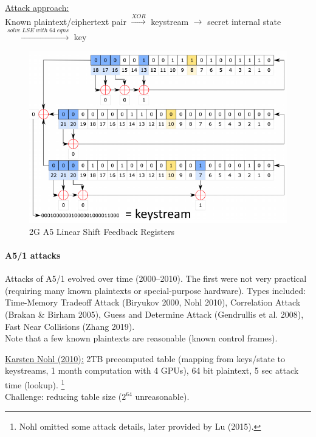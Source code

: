 \underline{Attack approach:} \\
Known plaintext/ciphertext pair
$\overset{XOR}{\longrightarrow}$ keystream
$\longrightarrow$ secret internal state
$\overset{solve\; LSE\; with\; 64\; eqns}{\longrightarrow}$ key

\begin{figure}[h]
	\centering
	\includegraphics[scale=0.5]{images/10-2g-a5.png}
	\caption{2G A5 Linear Shift Feedback Registers}
	\label{fig:2g-a5}
\end{figure}

\paragraph{A5/1 attacks}
Attacks of A5/1 evolved over time (2000--2010). The first were not very
practical (requiring many known plaintexts or special-purpose hardware). Types
included: Time-Memory Tradeoff Attack (Biryukov 2000, Nohl 2010), Correlation
Attack (Brakan \& Birham 2005), Guess and Determine Attack (Gendrullis et al.
2008), Fast Near Collisions (Zhang 2019). \\ Note that a few known plaintexts
are reasonable (known control frames).

\href{https://media.blackhat.com/bh-us-10/whitepapers/Nohl/BlackHat-USA-2010-Nohl-Attacking.Phone.Privacy-wp.pdf}{\underline{Karsten Nohl (2010):}}
2TB precomputed table (mapping from keys/state to keystreams, 1 month computation with 4 GPUs), 64 bit plaintext, 5 sec attack time (lookup).%
\footnote{Nohl omitted some attack details, later provided by Lu (2015).}
\\
Challenge: reducing table size ($2^{64}$ unreasonable).

